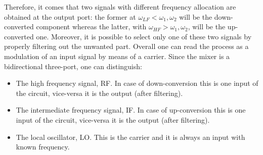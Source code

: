 Therefore, it comes that two signals with different frequency allocation are obtained at the output port: the former at $\omega_{LF}<\omega_1,\omega_2$ will be the down-converted component whereas the latter, with $\omega_{HF}>\omega_1,\omega_2$, will be the up-converted one.  Moreover, it is possible to select only one of these two signals by properly filtering out the unwanted part.
Overall one can read the process as a modulation of an input signal by means of a carrier.  Since the mixer is a bidirectional three-port, one can distinguish: 
\begin{itemize}
	\item The high frequency signal, RF. In case of down-conversion this is one input of the circuit, vice-versa it is the output (after filtering).
	\item The intermediate frequency signal, IF. In case of up-conversion this is one input of the circuit, vice-versa it is the output (after filtering).
	\item The local oscillator, LO. This is the carrier and it is always an input with known frequency.
\end{itemize}

